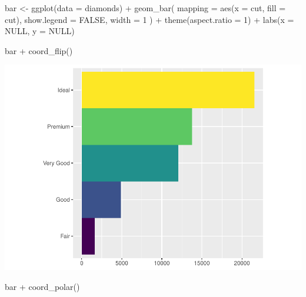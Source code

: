 \documentclass[
]{article}
\newenvironment{Shaded}{\begin{snugshade}}{\end{snugshade}}
\newcommand{\AttributeTok}[1]{\textcolor[rgb]{0.77,0.63,0.00}{#1}}
\newcommand{\ConstantTok}[1]{\textcolor[rgb]{0.00,0.00,0.00}{#1}}
\newcommand{\DecValTok}[1]{\textcolor[rgb]{0.00,0.00,0.81}{#1}}
\newcommand{\FunctionTok}[1]{\textcolor[rgb]{0.00,0.00,0.00}{#1}}
\newcommand{\NormalTok}[1]{#1}
\newcommand{\OtherTok}[1]{\textcolor[rgb]{0.56,0.35,0.01}{#1}}
\newcommand{\SpecialCharTok}[1]{\textcolor[rgb]{0.00,0.00,0.00}{#1}}
\begin{document}
\begin{Shaded}
\begin{Highlighting}[]
\NormalTok{bar }\OtherTok{\textless{}{-}} \FunctionTok{ggplot}\NormalTok{(}\AttributeTok{data =}\NormalTok{ diamonds) }\SpecialCharTok{+} 
  \FunctionTok{geom\_bar}\NormalTok{(}
    \AttributeTok{mapping =} \FunctionTok{aes}\NormalTok{(}\AttributeTok{x =}\NormalTok{ cut, }\AttributeTok{fill =}\NormalTok{ cut), }
    \AttributeTok{show.legend =} \ConstantTok{FALSE}\NormalTok{,}
    \AttributeTok{width =} \DecValTok{1}
\NormalTok{  ) }\SpecialCharTok{+} 
  \FunctionTok{theme}\NormalTok{(}\AttributeTok{aspect.ratio =} \DecValTok{1}\NormalTok{) }\SpecialCharTok{+}
  \FunctionTok{labs}\NormalTok{(}\AttributeTok{x =} \ConstantTok{NULL}\NormalTok{, }\AttributeTok{y =} \ConstantTok{NULL}\NormalTok{)}

\NormalTok{bar }\SpecialCharTok{+} \FunctionTok{coord\_flip}\NormalTok{()}
\end{Highlighting}
\end{Shaded}

\includegraphics{Assignments_files/figure-latex/unnamed-chunk-55-1.pdf}

\begin{Shaded}
\begin{Highlighting}[]
\NormalTok{bar }\SpecialCharTok{+} \FunctionTok{coord\_polar}\NormalTok{()}
\end{Highlighting}
\end{Shaded}
\end{document}
